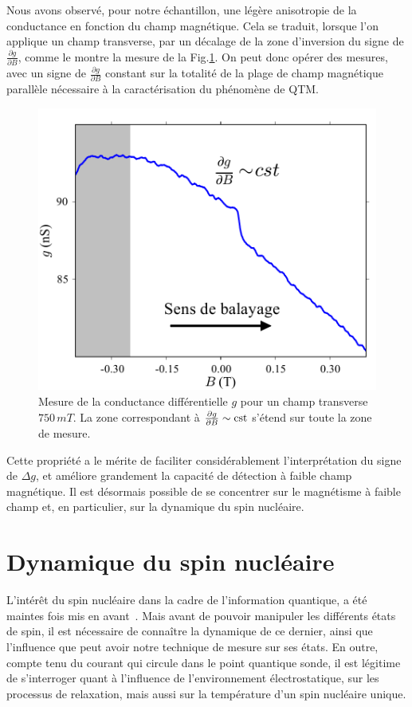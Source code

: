 Nous avons observé, pour notre échantillon, une légère anisotropie de la conductance en fonction du champ magnétique. Cela se traduit, lorsque l'on applique un champ transverse, par un décalage de la zone d'inversion du signe de $\frac{\partial g}{\partial B}$, comme le montre la mesure de la Fig.\ref{TransInfl}. On peut donc opérer des mesures, avec un signe de  $\frac{\partial g}{\partial B}$ constant sur la totalité de la plage de champ magnétique parallèle nécessaire à la caractérisation du phénomène de QTM.


\begin{figure}
\parbox{7cm}{
\includegraphics[scale=0.45]{Resultats/TransInfl/TransInfl.pdf} 
}
\parbox{6.5cm}{\caption{Mesure de la conductance différentielle $g$ pour un champ transverse $750\,mT$. La zone correspondant à $\frac{\partial g}{\partial B} \sim \rm{cst}$ s'étend sur toute la zone de mesure.}
\label{TransInfl}
}
\end{figure}




Cette propriété a le mérite de faciliter considérablement l'interprétation du signe de $\Delta g$, et améliore grandement la capacité de détection à faible champ magnétique. Il est désormais possible de se concentrer sur le magnétisme à faible champ et, en particulier, sur la dynamique du spin nucléaire. 

\section{Dynamique du spin nucléaire}
L’intérêt du spin nucléaire dans la cadre de l'information quantique, a été maintes fois mis en avant~\cite{Kane1998,Vandersypen2001,Leuenberger2003}. Mais avant de pouvoir manipuler les différents états de spin, il est nécessaire de connaître la dynamique de ce dernier, ainsi que l'influence que peut avoir notre technique de mesure sur ses états. En outre, compte tenu du courant qui circule dans le point quantique sonde, il est légitime de s'interroger quant à l'influence de l'environnement électrostatique, sur les processus de relaxation, mais aussi sur la température d'un spin nucléaire unique. 

